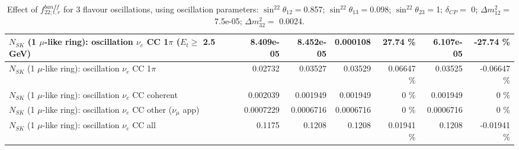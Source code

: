 \begin{table}
\begin{tabular}{| l | r | r | r  r | r  r |}
$N_{SK}$ (1 $\mu$-like ring): oscillation $\nu_e$ CC 1$\pi$ ($E_{t} \geq$ 2.5 GeV) &       8.409e-05 &       8.452e-05 &        0.000108 &    27.74 \%  &       6.107e-05 &   -27.74 \%  \\ 
\hline
                     $N_{SK}$ (1 $\mu$-like ring): oscillation $\nu_e$ CC 1$\pi$ &         0.02732 &         0.03527 &         0.03529 &  0.06647 \%  &         0.03525 & -0.06647 \%  \\ 
                   $N_{SK}$ (1 $\mu$-like ring): oscillation $\nu_e$ CC coherent &        0.002039 &        0.001949 &        0.001949 &        0 \%  &        0.001949 &        0 \%  \\ 
      $N_{SK}$ (1 $\mu$-like ring): oscillation $\nu_e$ CC other ($\nu_\mu$ app) &       0.0007229 &       0.0006716 &       0.0006716 &        0 \%  &       0.0006716 &        0 \%  \\ 
                       $N_{SK}$ (1 $\mu$-like ring): oscillation $\nu_e$  CC all &          0.1175 &          0.1208 &          0.1208 &  0.01941 \%  &          0.1208 & -0.01941 \%  \\ 
\hline
\hline
\end{tabular}
\caption{ Effect of $f_{22; t, r}^{banff}$ for 3 flavour oscillations, using oscillation parameters:  $\sin^22\theta_{12} = $0.857; $\sin^22\theta_{13} = $0.098; $\sin^22\theta_{23} = $1; $\delta_{CP} = $        0; $\Delta m^2_{12} = $    7.5e-05; $\Delta m^2_{32} = $    0.0024. }
\label{tab:num_banff_cc1piE1_1RmuT_3f_osc_t13:0.098}
\end{table}
\clearpage
